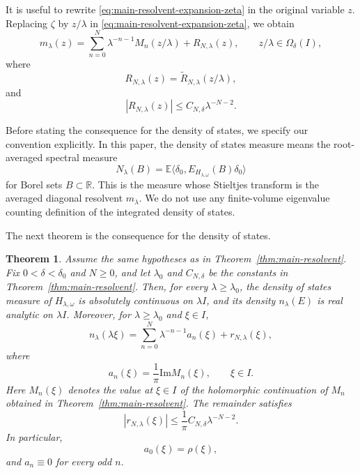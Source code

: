 \documentclass[a4paper,11pt]{article}
\newtheorem{thm}{Theorem}[section]
\newcommand{\E}{\mathbb{E}}
\newcommand{\Impart}{\mathrm{Im}}
\begin{document}
It is useful to rewrite \eqref{eq:main-resolvent-expansion-zeta} in the
original variable $z$. Replacing $\zeta$ by $z/\lambda$ in
\eqref{eq:main-resolvent-expansion-zeta}, we obtain
\begin{equation}
\label{eq:main-resolvent-expansion}
m_\lambda(z)=\sum_{n=0}^{N}\lambda^{-n-1}M_n(z/\lambda)+R_{N,\lambda}(z),
\qquad z/\lambda\in\Omega_\delta(I),
\end{equation}
where
$$
R_{N,\lambda}(z)=\widetilde R_{N,\lambda}(z/\lambda),
$$
and
\begin{equation}
\label{eq:main-resolvent-remainder}
|R_{N,\lambda}(z)|
\le
C_{N,\delta}\lambda^{-N-2}.
\end{equation}

Before stating the consequence for the density of states, we specify our convention explicitly. 
In this paper, the density of states measure means the root-averaged spectral measure
$$
N_\lambda(B)
=
\E\langle \delta_0,E_{H_{\lambda,\omega}}(B)\delta_0\rangle
$$
for Borel sets $B\subset\mathbb R$. 
This is the measure whose Stieltjes transform is the averaged diagonal resolvent $m_\lambda$. 
We do not use any finite-volume eigenvalue counting definition of the integrated density of states.

The next theorem is the consequence for the density of states.

\begin{thm}
\label{thm:main-dos}
Assume the same hypotheses as in Theorem~\ref{thm:main-resolvent}. Fix
$0<\delta<\delta_0$ and $N\ge0$, and let $\lambda_0$ and
$C_{N,\delta}$ be the constants in Theorem~\ref{thm:main-resolvent}.
Then, for every $\lambda\ge\lambda_0$, the density of states measure of
$H_{\lambda,\omega}$ is absolutely continuous on $\lambda I$, and its
density $n_\lambda(E)$ is real analytic on $\lambda I$. Moreover, for
$\lambda\ge\lambda_0$ and $\xi\in I$,
\begin{equation}
\label{eq:main-dos-expansion}
n_\lambda(\lambda\xi)
=
\sum_{n=0}^{N}\lambda^{-n-1}a_n(\xi)
+
r_{N,\lambda}(\xi),
\end{equation}
where
\begin{equation}
\label{eq:an-def}
a_n(\xi)
=
\frac{1}{\pi}\Impart M_n(\xi),
\qquad
\xi\in I.
\end{equation}
Here $M_n(\xi)$ denotes the value at $\xi\in I$ of the holomorphic
continuation of $M_n$ obtained in Theorem~\ref{thm:main-resolvent}.
The remainder satisfies
\begin{equation}
\label{eq:rn-bound}
|r_{N,\lambda}(\xi)|
\le
\frac{1}{\pi}C_{N,\delta}\lambda^{-N-2}.
\end{equation}
In particular,
\begin{equation}
\label{eq:a0-rho}
a_0(\xi)=\rho(\xi),
\end{equation}
and $a_n\equiv0$ for every odd $n$.
\end{thm}
\end{document}
